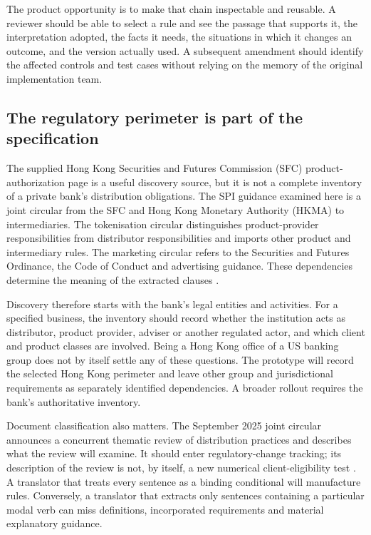 The product opportunity is to make that chain inspectable and reusable. A
reviewer should be able to select a rule and see the passage that supports it,
the interpretation adopted, the facts it needs, the situations in which it changes
an outcome, and the version actually used. A subsequent amendment should identify
the affected controls and test cases without relying on the memory of the
original implementation team.

\subsection{The regulatory perimeter is part of the specification}

The supplied Hong Kong Securities and Futures Commission (SFC) product-authorization
page is a useful discovery source, but it
is not a complete inventory of a private bank's distribution obligations. The
SPI guidance examined here is a joint circular from the SFC and Hong Kong Monetary
Authority (HKMA) to intermediaries. The
tokenisation circular distinguishes product-provider responsibilities from
distributor responsibilities and imports other product and intermediary rules.
The marketing circular refers to the Securities and Futures Ordinance, the Code
of Conduct and advertising guidance. These dependencies determine the meaning of
the extracted clauses \citep{sfcindex,sfcspi,sfctoken2026,sfcmarketing}.

Discovery therefore starts with the bank's legal entities and activities. For a
specified business, the inventory should record whether the institution acts as
distributor, product provider, adviser or another regulated actor, and which
client and product classes are involved. Being a Hong Kong office of a US banking
group does not by itself settle any of these questions. The prototype will record
the selected Hong Kong perimeter and leave other group and jurisdictional
requirements as separately identified dependencies. A broader rollout requires
the bank's authoritative inventory.

Document classification also matters. The September 2025 joint circular announces
a concurrent thematic review of distribution practices and describes what the
review will examine. It should enter regulatory-change tracking; its description
of the review is not, by itself, a new numerical client-eligibility test
\citep{sfcreview2025}. A translator that treats every sentence as a binding
conditional will manufacture rules. Conversely, a translator that extracts only
sentences containing a particular modal verb can miss definitions, incorporated
requirements and material explanatory guidance.

